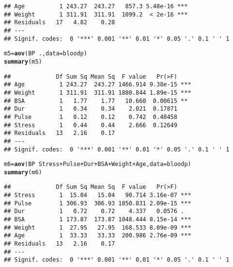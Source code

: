 \documentclass[10pt]{article}\usepackage[]{graphicx}\usepackage[]{color}
\makeatletter
\newcommand{\hlopt}[1]{\textcolor[rgb]{0,0,0}{#1}}%
\newcommand{\hlstd}[1]{\textcolor[rgb]{0.345,0.345,0.345}{#1}}%
\newcommand{\hlkwb}[1]{\textcolor[rgb]{0.69,0.353,0.396}{#1}}%
\newcommand{\hlkwc}[1]{\textcolor[rgb]{0.333,0.667,0.333}{#1}}%
\newcommand{\hlkwd}[1]{\textcolor[rgb]{0.737,0.353,0.396}{\textbf{#1}}}%
\newenvironment{kframe}{%
 \def\at@end@of@kframe{}%
 \ifinner\ifhmode%
  \def\at@end@of@kframe{\end{minipage}}%
  \begin{minipage}{\columnwidth}%
 \fi\fi%
 \def\FrameCommand##1{\hskip\@totalleftmargin \hskip-\fboxsep
 \colorbox{shadecolor}{##1}\hskip-\fboxsep
     \hskip-\linewidth \hskip-\@totalleftmargin \hskip\columnwidth}%
 \MakeFramed {\advance\hsize-\width
   \@totalleftmargin\z@ \linewidth\hsize
   \@setminipage}}%
 {\par\unskip\endMakeFramed%
 \at@end@of@kframe}
\newenvironment{knitrout}{}{} %
\makeatother
\begin{document}
\begin{knitrout}
\begin{kframe}
\begin{verbatim}
## Age          1 243.27  243.27   857.3 5.48e-16 ***
## Weight       1 311.91  311.91  1099.2  < 2e-16 ***
## Residuals   17   4.82    0.28                     
## ---
## Signif. codes:  0 '***' 0.001 '**' 0.01 '*' 0.05 '.' 0.1 ' ' 1
\end{verbatim}
\begin{alltt}
\hlstd{m5} \hlkwb{=} \hlkwd{aov}\hlstd{(BP}\hlopt{~}\hlstd{.,} \hlkwc{data}\hlstd{=bloodp)}
\hlkwd{summary}\hlstd{(m5)}
\end{alltt}
\begin{verbatim}
##             Df Sum Sq Mean Sq  F value   Pr(>F)    
## Age          1 243.27  243.27 1466.914 9.38e-15 ***
## Weight       1 311.91  311.91 1880.844 1.89e-15 ***
## BSA          1   1.77    1.77   10.660  0.00615 ** 
## Dur          1   0.34    0.34    2.021  0.17871    
## Pulse        1   0.12    0.12    0.742  0.40458    
## Stress       1   0.44    0.44    2.666  0.12649    
## Residuals   13   2.16    0.17                      
## ---
## Signif. codes:  0 '***' 0.001 '**' 0.01 '*' 0.05 '.' 0.1 ' ' 1
\end{verbatim}
\begin{alltt}
\hlstd{m6} \hlkwb{=} \hlkwd{aov}\hlstd{(BP}\hlopt{~}\hlstd{Stress}\hlopt{+}\hlstd{Pulse}\hlopt{+}\hlstd{Dur}\hlopt{+}\hlstd{BSA}\hlopt{+}\hlstd{Weight}\hlopt{+}\hlstd{Age,} \hlkwc{data}\hlstd{=bloodp)}
\hlkwd{summary}\hlstd{(m6)}
\end{alltt}
\begin{verbatim}
##             Df Sum Sq Mean Sq  F value   Pr(>F)    
## Stress       1  15.04   15.04   90.714 3.16e-07 ***
## Pulse        1 306.93  306.93 1850.831 2.09e-15 ***
## Dur          1   0.72    0.72    4.337   0.0576 .  
## BSA          1 173.87  173.87 1048.444 8.15e-14 ***
## Weight       1  27.95   27.95  168.533 8.09e-09 ***
## Age          1  33.33   33.33  200.986 2.76e-09 ***
## Residuals   13   2.16    0.17                      
## ---
## Signif. codes:  0 '***' 0.001 '**' 0.01 '*' 0.05 '.' 0.1 ' ' 1
\end{verbatim}
\end{kframe}
\end{knitrout}
\end{document}
